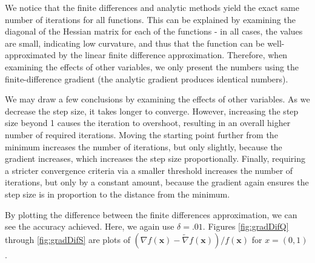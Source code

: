 \documentclass[11pt,letterpaper]{article}
\begin{document}
We notice that the finite differences and analytic methods yield the exact same number of iterations for all functions. This can be explained by examining the diagonal of the Hessian matrix for each of the functions - in all cases, the values are small, indicating low curvature, and thus that the function can be well-approximated by the linear finite difference approximation. Therefore, when examining the effects of other variables, we only present the numbers using the finite-difference gradient (the analytic gradient produces identical numbers).

We may draw a few conclusions by examining the effects of other variables. As we decrease the step size, it takes longer to converge. However, increasing the step size beyond 1 causes the iteration to overshoot, resulting in an overall higher number of required iterations. Moving the starting point further from the minimum increases the number of iterations, but only slightly, because the gradient increases, which increases the step size proportionally. Finally, requiring a stricter convergence criteria via a smaller threshold increases the number of iterations, but only by a constant amount, because the gradient again ensures the step size is in proportion to the distance from the minimum.

By plotting the difference between the finite differences approximation, we can see the accuracy achieved. Here, we again use $\delta = .01$. Figures \ref{fig:gradDifQ} through \ref{fig:gradDifS} are plots of $(\nabla f(\mathbf{x}) - \tilde{\nabla} f(\mathbf{x}))/f(\mathbf{x})$ for $x=(0,1)$.
\end{document}
